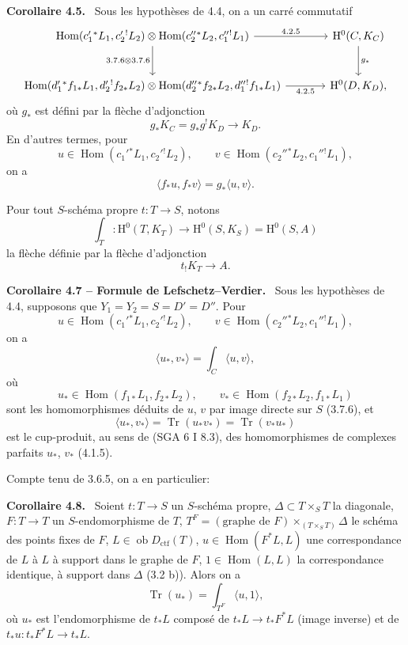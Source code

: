 \documentclass[11pt]{article}
\newenvironment{statement}[1]{\par\medskip\noindent\textbf{#1.}\ }{\par\medskip}
\renewcommand{\H}{\mathrm{H}}
\DeclareMathOperator{\Hom}{Hom}
\newcommand{\ob}{\operatorname{ob}}
\providecommand{\Dctf}{D_{\mathrm{ctf}}}
\providecommand{\Tr}{\operatorname{Tr}}
\providecommand{\Tr}{\operatorname{Tr}}
\providecommand{\Dctf}{D_{\mathrm{ctf}}}
\providecommand{\Tr}{\operatorname{Tr}}
\providecommand{\Hom}{\operatorname{Hom}}
\providecommand{\ob}{\operatorname{ob}}
\providecommand{\Tr}{\operatorname{Tr}}
\providecommand{\Hom}{\operatorname{Hom}}
\providecommand{\Tr}{\operatorname{Tr}}
\begin{document}
\begin{statement}{Corollaire 4.5}
Sous les hypothèses de 4.4, on a un carré commutatif
\[
\begin{tikzcd}[column sep=large,row sep=large]
\Hom(c_1'{}^*L_1,c_2'{}^!L_2)\otimes
\Hom(c_2''{}^*L_2,c_1''{}^!L_1)
 \arrow[r,"4.2.5"] \arrow[d,"3.7.6\otimes 3.7.6"'] &
\H^0(C,K_C)\arrow[d,"g_*"]\\
\Hom(d_1'{}^*f_{1*}L_1,d_2'{}^!f_{2*}L_2)\otimes
\Hom(d_2''{}^*f_{2*}L_2,d_1''{}^!f_{1*}L_1)
 \arrow[r,"4.2.5"'] &
\H^0(D,K_D),
\end{tikzcd}
\]
où $g_*$ est défini par la flèche d'adjonction
\[
g_*K_C=g_*g^!K_D\longrightarrow K_D.
\]
En d'autres termes, pour
\[
u\in\Hom(c_1'{}^*L_1,c_2'{}^!L_2),\qquad
v\in\Hom(c_2''{}^*L_2,c_1''{}^!L_1),
\]
on a
\begin{equation}
\tag{4.5.1}
\langle f_*u,f_*v\rangle=g_*\langle u,v\rangle.
\end{equation}
\end{statement}

Pour tout $S$-schéma propre $t:T\longrightarrow S$, notons
\begin{equation}
\tag{4.6}
\int_T:\H^0(T,K_T)\longrightarrow \H^0(S,K_S)=\H^0(S,A)
\end{equation}
la flèche définie par la flèche d'adjonction
\[
t_!K_T\longrightarrow A.
\]

\begin{statement}{Corollaire 4.7 -- Formule de Lefschetz--Verdier}
Sous les hypothèses de 4.4, supposons que $Y_1=Y_2=S=D'=D''$. Pour
\[
u\in\Hom(c_1'{}^*L_1,c_2'{}^!L_2),\qquad
v\in\Hom(c_2''{}^*L_2,c_1''{}^!L_1),
\]
on a
\begin{equation}
\tag{4.7.1}
\langle u_*,v_*\rangle=\int_C\langle u,v\rangle,
\end{equation}
où
\[
u_*\in\Hom(f_{1*}L_1,f_{2*}L_2),\qquad
v_*\in\Hom(f_{2*}L_2,f_{1*}L_1)
\]
sont les homomorphismes déduits de $u$, $v$ par image directe sur $S$ (3.7.6), et
\[
\langle u_*,v_*\rangle=\Tr(u_*v_*)=\Tr(v_*u_*)
\]
est le cup-produit, au sens de (SGA 6 I 8.3), des homomorphismes de complexes parfaits $u_*$, $v_*$ (4.1.5).
\end{statement}

Compte tenu de 3.6.5, on a en particulier:

\begin{statement}{Corollaire 4.8}
Soient $t:T\longrightarrow S$ un $S$-schéma propre, $\Delta\subset T\times_S T$ la diagonale, $F:T\longrightarrow T$ un $S$-endomorphisme de $T$, $T^F=(\text{graphe de }F)\times_{(T\times_S T)}\Delta$ le schéma des points fixes de $F$, $L\in\ob\Dctf(T)$, $u\in\Hom(F^*L,L)$ une correspondance de $L$ à $L$ à support dans le graphe de $F$, $1\in\Hom(L,L)$ la correspondance identique, à support dans $\Delta$ (3.2 b)). Alors on a
\[
\Tr(u_*)=\int_{T^F}\langle u,1\rangle,
\]
où $u_*$ est l'endomorphisme de $t_*L$ composé de $t_*L\longrightarrow t_*F^*L$ (image inverse) et de $t_*u:t_*F^*L\longrightarrow t_*L$.
\end{statement}
\end{document}

